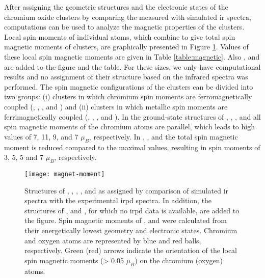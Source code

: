 \begin{refsection}
After assigning the geometric structures and the electronic states of the chromium oxide clusters by comparing the measured with simulated \acrshort{ir} spectra, computations can be used to analyze the magnetic properties of the clusters. Local spin moments of individual atoms, which combine to give total spin magnetic moments of clusters, are graphically presented in Figure \ref{fig:magnet}. Values of these local spin magnetic moments are given in Table \ref{table:magnetic}. Also ,  and  are added to the figure and the table. For these sizes, we only have computational results and no assignment of their structure based on the infrared spectra was performed. The spin magnetic configurations of the clusters can be divided into two groups: (i) clusters in which chromium spin moments are ferromagnetically coupled (, , , and ) and (ii) clusters in which metallic spin moments are ferrimagnetically coupled (, , , and ). In the ground-state structures of , , , and  all spin magnetic moments of the chromium atoms are parallel, which leads to high values of 7, 11, 9, and 7 $\mu_B$, respectively. In , ,  and  the total spin magnetic moment is reduced compared to the maximal values, resulting in spin moments of 3, 5, 5 and 7 $\mu_B$, respectively. 

\begin{figure}[htb!]
	\centering
	\texttt{[image: magnet-moment]}
	\caption{Structures of , , , , and  as assigned by comparison of simulated \acrshort{ir} spectra with the experimental \acrshort{irpd} spectra. In addition, the structures of ,  and , for which no \acrshort{irpd} data is available, are added to the figure. Spin magnetic moments of ,  and  were calculated from their energetically lowest geometry and electronic states. Chromium and oxygen atoms are represented by blue and red balls, respectively. Green (red) arrows indicate the orientation of the local spin magnetic moments (> 0.05 $\mu_B$) on the chromium (oxygen) atoms.}
	\label{fig:magnet}
\end{figure}



\end{refsection}
